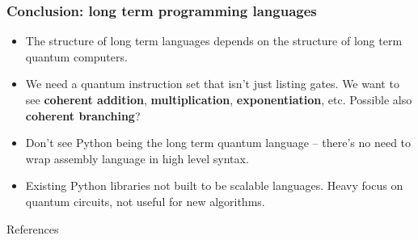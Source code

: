 \documentclass{beamer}
\begin{document}
\begin{frame}
\frametitle{Conclusion: long term programming languages}
\begin{itemize}
\item The structure of long term languages depends on the structure of long term quantum
    computers.
\item We need a quantum instruction set that isn't just listing gates. We want to see \textbf{coherent addition}, \textbf{multiplication}, \textbf{exponentiation}, etc. Possible also \textbf{coherent branching}?
\item Don't see Python being the long term quantum language -- there's no need to wrap assembly language in high level syntax. 
\item Existing Python libraries not built to be scalable languages. Heavy focus on quantum circuits, not useful for new algorithms.
\end{itemize}
\end{frame}

\begin{frame}{References}


\end{frame}
\end{document}
